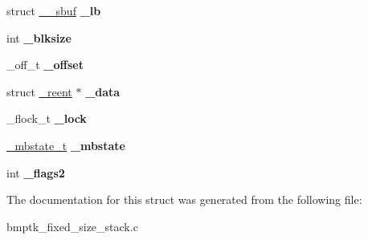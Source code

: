 \begin{DoxyCompactItemize}
\item 
struct \hyperlink{struct____sbuf}{\+\_\+\+\_\+sbuf} {\bfseries \+\_\+lb}\hypertarget{struct____s_f_i_l_e_a10126d337f5164c194422377921191b6}{}\label{struct____s_f_i_l_e_a10126d337f5164c194422377921191b6}

\item 
int {\bfseries \+\_\+blksize}\hypertarget{struct____s_f_i_l_e_a9389845232737f9c0774a8c7485d9f45}{}\label{struct____s_f_i_l_e_a9389845232737f9c0774a8c7485d9f45}

\item 
\+\_\+off\+\_\+t {\bfseries \+\_\+offset}\hypertarget{struct____s_f_i_l_e_a11e3ebedebcb4b40fafccab143e4fd63}{}\label{struct____s_f_i_l_e_a11e3ebedebcb4b40fafccab143e4fd63}

\item 
struct \hyperlink{struct__reent}{\+\_\+reent} $\ast$ {\bfseries \+\_\+data}\hypertarget{struct____s_f_i_l_e_ad4ab198f609e1716c937d24d75d5a368}{}\label{struct____s_f_i_l_e_ad4ab198f609e1716c937d24d75d5a368}

\item 
\+\_\+flock\+\_\+t {\bfseries \+\_\+lock}\hypertarget{struct____s_f_i_l_e_a368157bed30ab1631886f5f028b50b89}{}\label{struct____s_f_i_l_e_a368157bed30ab1631886f5f028b50b89}

\item 
\hyperlink{struct__mbstate__t}{\+\_\+mbstate\+\_\+t} {\bfseries \+\_\+mbstate}\hypertarget{struct____s_f_i_l_e_a3bd1755e7d31de6116993975cc761a60}{}\label{struct____s_f_i_l_e_a3bd1755e7d31de6116993975cc761a60}

\item 
int {\bfseries \+\_\+flags2}\hypertarget{struct____s_f_i_l_e_aa888d0868311a4b98b28811168b64520}{}\label{struct____s_f_i_l_e_aa888d0868311a4b98b28811168b64520}

\end{DoxyCompactItemize}


The documentation for this struct was generated from the following file\+:\begin{DoxyCompactItemize}
\item 
bmptk\+\_\+fixed\+\_\+size\+\_\+stack.\+c\end{DoxyCompactItemize}
